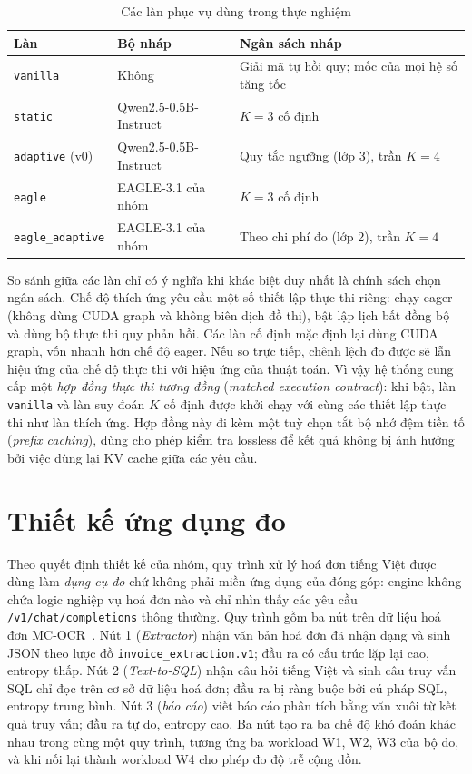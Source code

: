 \begin{table}[htbp]
\centering
\caption{Các làn phục vụ dùng trong thực nghiệm}
\label{tab:lan}
\small
\begin{tabularx}{\linewidth}{@{}>{\raggedright\arraybackslash}p{33mm}>{\raggedright\arraybackslash}p{30mm}>{\raggedright\arraybackslash}X@{}}
\toprule
\textbf{Làn} & \textbf{Bộ nháp} & \textbf{Ngân sách nháp} \\
\midrule
\texttt{vanilla} & Không & Giải mã tự hồi quy; mốc của mọi hệ số tăng tốc \\
\texttt{static} & Qwen2.5-0.5B-Instruct & $K=3$ cố định \\
\texttt{adaptive} (v0) & Qwen2.5-0.5B-Instruct & Quy tắc ngưỡng (lớp 3), trần $K=4$ \\
\texttt{eagle} & EAGLE-3.1 của nhóm & $K=3$ cố định \\
\texttt{eagle\_adaptive} & EAGLE-3.1 của nhóm & Theo chi phí đo (lớp 2), trần $K=4$ \\
\bottomrule
\end{tabularx}
\end{table}

So sánh giữa các làn chỉ có ý nghĩa khi khác biệt duy nhất là chính sách chọn ngân sách. Chế độ thích ứng yêu cầu một số thiết lập thực thi riêng: chạy eager (không dùng CUDA graph và không biên dịch đồ thị), bật lập lịch bất đồng bộ và dùng bộ thực thi quy phản hồi. Các làn cố định mặc định lại dùng CUDA graph, vốn nhanh hơn chế độ eager. Nếu so trực tiếp, chênh lệch đo được sẽ lẫn hiệu ứng của chế độ thực thi với hiệu ứng của thuật toán. Vì vậy hệ thống cung cấp một \textit{hợp đồng thực thi tương đồng} (\textit{matched execution contract}): khi bật, làn \texttt{vanilla} và làn suy đoán $K$ cố định được khởi chạy với cùng các thiết lập thực thi như làn thích ứng. Hợp đồng này đi kèm một tuỳ chọn tắt bộ nhớ đệm tiền tố (\textit{prefix caching}), dùng cho phép kiểm tra lossless để kết quả không bị ảnh hưởng bởi việc dùng lại KV cache giữa các yêu cầu.

\section{Thiết kế ứng dụng đo}
\label{sec:ung-dung-do}

Theo quyết định thiết kế của nhóm, quy trình xử lý hoá đơn tiếng Việt được dùng làm \emph{dụng cụ đo} chứ không phải miền ứng dụng của đóng góp: engine không chứa logic nghiệp vụ hoá đơn nào và chỉ nhìn thấy các yêu cầu \texttt{/v1/chat/completions} thông thường. Quy trình gồm ba nút trên dữ liệu hoá đơn MC-OCR~\cite{vu2021mcocr}. Nút 1 (\textit{Extractor}) nhận văn bản hoá đơn đã nhận dạng và sinh JSON theo lược đồ \texttt{invoice\_extraction.v1}; đầu ra có cấu trúc lặp lại cao, entropy thấp. Nút 2 (\textit{Text-to-SQL}) nhận câu hỏi tiếng Việt và sinh câu truy vấn SQL chỉ đọc trên cơ sở dữ liệu hoá đơn; đầu ra bị ràng buộc bởi cú pháp SQL, entropy trung bình. Nút 3 (\textit{báo cáo}) viết báo cáo phân tích bằng văn xuôi từ kết quả truy vấn; đầu ra tự do, entropy cao. Ba nút tạo ra ba chế độ khó đoán khác nhau trong cùng một quy trình, tương ứng ba workload W1, W2, W3 của bộ đo, và khi nối lại thành workload W4 cho phép đo độ trễ cộng dồn.

